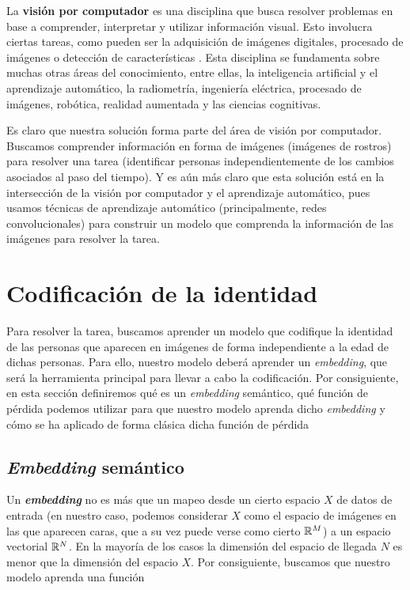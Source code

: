 La \textbf{visión por computador} es una disciplina que busca resolver problemas en base a comprender, interpretar y utilizar información visual. Esto involucra ciertas tareas, como pueden ser la adquisición de imágenes digitales, procesado de imágenes o detección de características \cite{informatica:cv_modern_approach}. Esta disciplina se fundamenta sobre muchas otras áreas del conocimiento, entre ellas, la inteligencia artificial y el aprendizaje automático, la radiometría, ingeniería eléctrica, procesado de imágenes, robótica, realidad aumentada y las ciencias cognitivas.

Es claro que nuestra solución forma parte del área de visión por computador. Buscamos comprender información en forma de imágenes (imágenes de rostros) para resolver una tarea (identificar personas independientemente de los cambios asociados al paso del tiempo). Y es aún más claro que esta solución está en la intersección de la visión por computador y el aprendizaje automático, pues usamos técnicas de aprendizaje automático (principalmente, redes convolucionales) para construir un modelo que comprenda la información de las imágenes para resolver la tarea.

\section{Codificación de la identidad}

Para resolver la tarea, buscamos aprender un modelo que codifique la identidad de las personas que aparecen en imágenes de forma independiente a la edad de dichas personas. Para ello, nuestro modelo deberá aprender un \textit{embedding}, que será la herramienta principal para llevar a cabo la codificación. Por consiguiente, en esta sección definiremos qué es un \textit{embedding} semántico, qué función de pérdida podemos utilizar para que nuestro modelo aprenda dicho \textit{embedding} y cómo se ha aplicado de forma clásica dicha función de pérdida

\subsection{\textit{Embedding} semántico} \label{isec:embeddings}

Un \textbf{\textit{embedding}} no es más que un mapeo desde un cierto espacio $X$ de datos de entrada (en nuestro caso, podemos considerar $X$ como el espacio de imágenes en las que aparecen caras, que a su vez puede verse como cierto $\mathbb{R}^M$) a un espacio vectorial $\mathbb{R}^N$. En la mayoría de los casos la dimensión del espacio de llegada $N$ es menor que la dimensión del espacio $X$. Por consiguiente, buscamos que nuestro modelo aprenda una función

